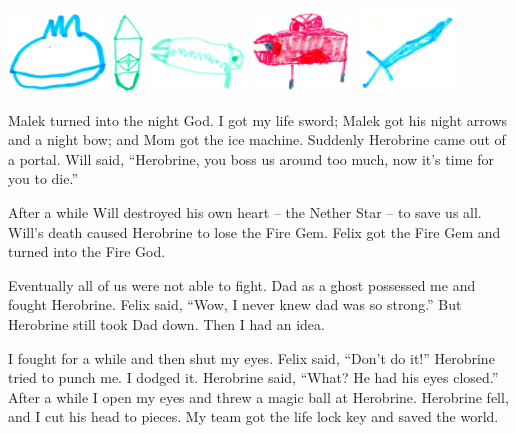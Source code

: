 \documentclass[12pt,twoside]{krantz}
\begin{document}
\includegraphics[width=1.04167in,height=\textheight]{img/herobrine-returns/weapons-blueball.jpg}
\includegraphics[width=0.3125in,height=\textheight]{img/herobrine-returns/weapons-green.jpg}
\includegraphics[width=1.04167in,height=\textheight]{img/herobrine-returns/weapons-greengun.jpg}
\includegraphics[width=1.04167in,height=\textheight]{img/herobrine-returns/weapons-redguy.jpg}
\includegraphics[width=1.04167in,height=\textheight]{img/herobrine-returns/weapons-sword.jpg}

Malek turned into the night God. I got my life sword; Malek got his
night arrows and a night bow; and Mom got the ice machine. Suddenly
Herobrine came out of a portal. Will said, ``Herobrine, you boss us
around too much, now it's time for you to die.''

After a while Will destroyed his own heart -- the Nether Star -- to save
us all. Will's death caused Herobrine to lose the Fire Gem. Felix got
the Fire Gem and turned into the Fire God.

Eventually all of us were not able to fight. Dad as a ghost possessed me
and fought Herobrine. Felix said, ``Wow, I never knew dad was so
strong.'' But Herobrine still took Dad down. Then I had an idea.

I fought for a while and then shut my eyes. Felix said, ``Don't do it!''
Herobrine tried to punch me. I dodged it. Herobrine said, ``What? He had
his eyes closed.'' After a while I open my eyes and threw a magic ball
at Herobrine. Herobrine fell, and I cut his head to pieces. My team got
the life lock key and saved the world.
\end{document}
